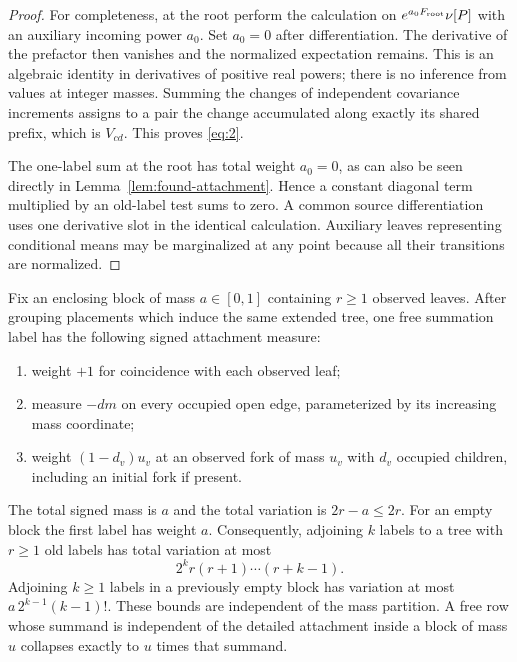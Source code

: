 \begin{proof}
For completeness, at the root perform the calculation on
$e^{a_0F_{\rm root}}\nu[P]$ with an auxiliary incoming power $a_0$.
Set $a_0=0$ after differentiation. The derivative of the prefactor then
vanishes and the normalized expectation remains. This is an algebraic
identity in derivatives of positive real powers; there is no inference
from values at integer masses. Summing the changes of independent
covariance increments assigns to a pair the change accumulated along
exactly its shared prefix, which is $V_{cd}$. This proves \eqref{eq:2}.

The one-label sum at the root has total weight $a_0=0$, as can also be
seen directly in Lemma~\ref{lem:found-attachment}. Hence a constant
diagonal term multiplied by an old-label test sums to zero. A common
source differentiation uses one derivative slot in the identical
calculation. Auxiliary leaves representing conditional means may be
marginalized at any point because all their transitions are normalized.
\end{proof}

\begin{lemma}\label{lem:found-attachment}
Fix an enclosing block of mass $a\in[0,1]$ containing $r\geq1$ observed
leaves. After grouping placements which induce the same extended tree,
one free summation label has the following signed attachment measure:
\begin{enumerate}[label=(\roman*)]
\item weight $+1$ for coincidence with each observed leaf;
\item measure $-dm$ on every occupied open edge, parameterized by its
      increasing mass coordinate;
\item weight $(1-d_v)u_v$ at an observed fork of mass $u_v$ with $d_v$
      occupied children, including an initial fork if present.
\end{enumerate}
The total signed mass is $a$ and the total variation is $2r-a\leq2r$.
For an empty block the first label has weight $a$. Consequently,
adjoining $k$ labels to a tree with $r\geq1$ old labels has total
variation at most
\[
 2^k r(r+1)\cdots(r+k-1).
\]
Adjoining $k\geq1$ labels in a previously empty block has variation at
most $a\,2^{k-1}(k-1)!$. These bounds are independent of the mass
partition. A free row whose summand is independent of the detailed
attachment inside a block of mass $u$ collapses exactly to $u$ times that
summand.
\end{lemma}

